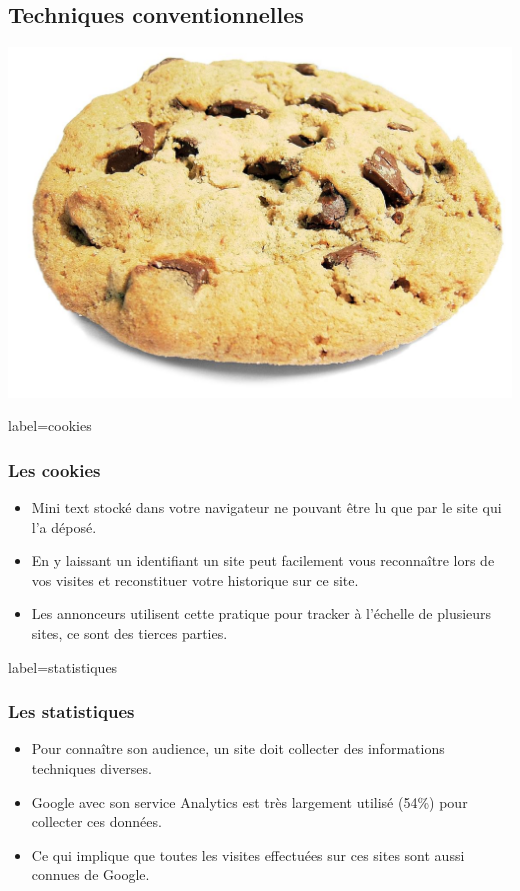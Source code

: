 \documentclass{beamer}
\begin{document}
    \subsection{Techniques conventionnelles}
        \begin{frame}
            \begin{center}
                \includegraphics[scale=0.15]{img/cookie.jpg}
            \end{center}
        \end{frame}
        \begin{frame}{label=cookies}
            \frametitle{Les cookies}
            \begin{center}
                \begin{itemize}
                    \item Mini text stocké dans votre navigateur ne pouvant être lu que par le site qui l'a déposé.
                    \item En y laissant un identifiant un site peut facilement vous reconnaître lors de vos visites et reconstituer votre historique sur ce site.
                    \item Les annonceurs utilisent cette pratique pour tracker à l'échelle de plusieurs sites, ce sont des tierces parties.
                \end{itemize}
            \end{center}
        \end{frame}
        \begin{frame}{label=statistiques}
            \frametitle{Les statistiques}
            \begin{center}
                \begin{itemize}
                    \item Pour connaître son audience, un site doit collecter des informations techniques diverses.
                    \item Google avec son service Analytics est très largement utilisé (54\%) pour collecter ces données.
                    \item Ce qui implique que toutes les visites effectuées sur ces sites sont aussi connues de Google.
                \end{itemize}
            \end{center}
        \end{frame}
\end{document}

